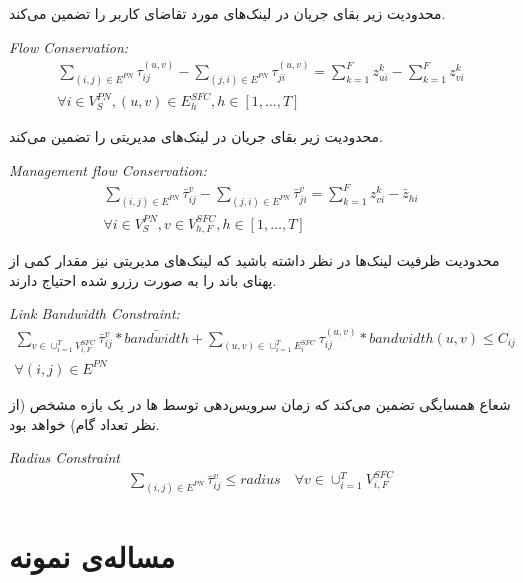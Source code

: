 محدودیت زیر بقای جریان در لینک‌های مورد تقاضای کاربر را تضمین می‌کند.
\begin{latin}
    \textit{Flow Conservation:}
    \begin{align}
        \sum_{(i,j) \in E^{PN}} \tau_{ij}^{(u,v)} - \sum_{(j,i) \in E^{PN}} \tau_{ji}^{(u,v)} = \sum_{k=1}^{F} z_{ui}^{k} - \sum_{k=1}^{F} z_{vi}^{k} \nonumber \\
        \forall i \in V_{S}^{PN}, (u,v) \in E_{h}^{SFC}, h \in [1,\ldots, T]
    \end{align}
\end{latin}

محدودیت زیر بقای جریان در لینک‌های مدیریتی را تضمین می‌کند.
\begin{latin}
    \textit{Management flow Conservation:}
    \begin{align}
        \sum_{(i,j) \in E^{PN}} \bar{\tau}_{ij}^{v} - \sum_{(j,i) \in E^{PN}} \bar{\tau}_{ji}^{v} = \sum_{k=1}^{F} z_{vi}^{k} - \bar{z}_{hi} \nonumber \\
        \forall i \in V_{S}^{PN}, v \in V_{h, F}^{SFC}, h \in [1,\ldots, T]
    \end{align}
\end{latin}

محدودیت ظرفیت لینک‌ها
در نظر داشته باشید که لینک‌های مدیریتی نیز مقدار کمی از پهنای باند را به صورت رزرو شده احتیاج دارند.
\begin{latin}
    \textit{Link Bandwidth Constraint:}
    \begin{align}
        \sum_{v \in \cup_{i=1}^{T} V_{i,F}^{SFC}} \bar{\tau}_{ij}^{v} * \bar{bandwidth} + \sum_{(u,v) \in \cup_{i=1}^{T} E_{i}^{SFC}} \tau_{ij}^{(u,v)} * bandwidth(u,v) \le C_{ij} \nonumber \\
        \forall (i, j) \in E^{PN}
    \end{align}
\end{latin}

شعاع همسایگی تضمین می‌کند که زمان سرویس‌دهی توسط
ها
در یک بازه مشخص (از نظر تعداد گام)
خواهد بود.
\begin{latin}
    \textit{Radius Constraint}
    \begin{align}
        \sum_{(i, j) \in E^{PN}} \bar{\tau}_{ij}^{v} \le radius
        \quad
        \forall v \in \cup_{i=1}^T V_{i, F}^{SFC}
    \end{align}
\end{latin}

\section{مساله‌ی نمونه}

